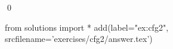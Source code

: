 
\begin{ex} 
  \label{ex:cfg2}
  
  \qed
\end{ex} 
\begin{python0}
from solutions import *
add(label="ex:cfg2",
    srcfilename='exercises/cfg2/answer.tex') 
\end{python0}
